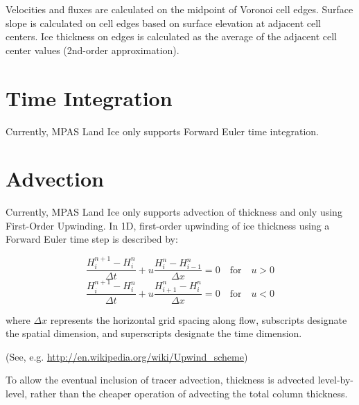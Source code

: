 Velocities and fluxes are calculated on the midpoint of Voronoi cell edges.  Surface slope is calculated on cell edges based on surface elevation at adjacent cell centers.  Ice thickness on edges is calculated as the average of the adjacent cell center values (2nd-order approximation).


\section{Time Integration}

Currently, MPAS Land Ice only supports Forward Euler time integration.


\section{Advection}

Currently, MPAS Land Ice only supports advection of thickness and only using First-Order Upwinding. 
In 1D, first-order upwinding of ice thickness using a Forward Euler time step is described by:

\begin{equation}
    \label{fouw}
 \frac{H_i^{n+1} - H_i^n}{\Delta t} + u \frac{H_i^n - H_{i-1}^n}{\Delta x} = 0 \quad \text{for} \quad u > 0
\end{equation}
\begin{equation}
 \frac{H_i^{n+1} - H_i^n}{\Delta t} + u \frac{H_{i+1}^n - H_i^n}{\Delta x} = 0 \quad \text{for} \quad u < 0
\end{equation}

where ${\Delta x}$ represents the horizontal grid spacing along flow, subscripts designate the spatial dimension, and superscripts designate the time dimension.

(See, e.g. \url{http://en.wikipedia.org/wiki/Upwind\_scheme})

To allow the eventual inclusion of tracer advection, thickness is advected level-by-level, rather than the cheaper operation of advecting the total column thickness.


